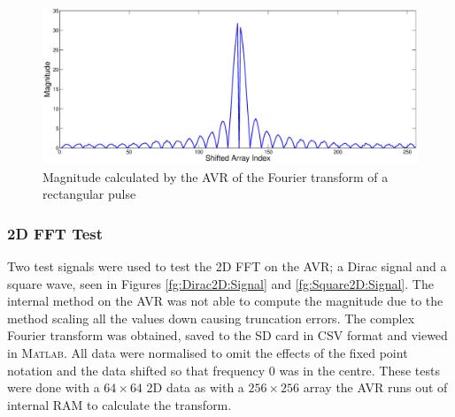 \begin{figure}
\includegraphics[width=\textwidth]{./Figures/AVR_FFT_Square_Mag.eps}
\caption{Magnitude calculated by the AVR of the Fourier transform of a rectangular pulse}
\label{fig:AVR:FFT:Square:Mag}
\end{figure}

\subsubsection{2D FFT Test}


Two test signals were used to test the 2D FFT on the AVR; a Dirac signal and a square wave, seen in Figures \ref{fg:Dirac2D:Signal} and \ref{fg:Square2D:Signal}. The internal method on the AVR was not able to compute the magnitude due to the method scaling all the values down causing truncation errors. The complex Fourier transform was obtained, saved to the SD card in CSV format and viewed in \textsc{Matlab}. All data were normalised to omit the effects of the fixed point notation and the data shifted so that frequency 0 was in the centre. These tests were done with a $64\times64$ 2D data as with a $256 \times 256$ array the AVR runs out of internal RAM to calculate the transform. 


